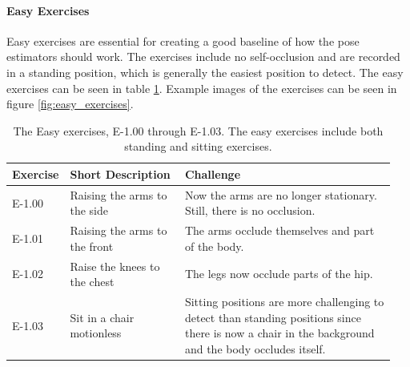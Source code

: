 \paragraph{Easy Exercises}

Easy exercises are essential for creating a good baseline of how the pose estimators should work. The exercises include no self-occlusion and are recorded in a standing position, which is generally the easiest position to detect. The easy exercises can be seen in table \ref{tab:easy_exercises}. Example images of the exercises can be seen in figure \ref{fig:easy_exercises}.

\begin{table}[htb]
  \caption[Easy Exercises]{The Easy exercises, E-1.00 through E-1.03. The easy exercises include both standing and sitting exercises.}
  \label{tab:easy_exercises}
  \begin{tabular}{p{0.1\linewidth}p{0.3\linewidth}p{0.55\linewidth}}
  \hline
  Exercise & Short Description             & Challenge \\ \hline
  E-1.00   & Raising the arms to the side  & Now the arms are no longer stationary. Still, there is no occlusion. \\
  E-1.01   & Raising the arms to the front & The arms occlude themselves and part of the body.  \\
  E-1.02   & Raise the knees to the chest  & The legs now occlude parts of the hip.  \\
  E-1.03   & Sit in a chair motionless     & Sitting positions are more challenging to detect than standing positions since there is now a chair in the background and the body occludes itself.\\ \hline
  \end{tabular}
  \end{table}

